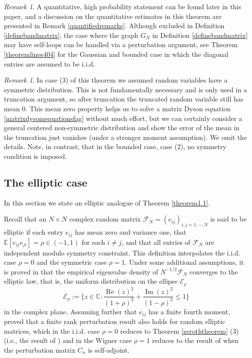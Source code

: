\documentclass[11pt,reqno]{amsart}
\theoremstyle{plain}
\theoremstyle{remark}
\newtheorem{remark}[theorem]{Remark}
\numberwithin{equation}{section}
\begin{document}
\begin{remark}\label{remark1.56}
     A quantitative, high probability statement can be found later in this paper, and a discussion on the quantitative estimates in this theorem are presented in Remark \ref{quantifiedremarks}. 
     Although excluded in Definition \ref{definebandmatrix}, the case where the graph $G_N$ in Definition \ref{definebandmatrix} may have self-loops can be handled via a perturbation argument, see Theorem \ref{theoremlines404} for the Gaussian and bounded case in which the diagonal entries are assumed to be i.i.d.
\end{remark}



\begin{remark}
    In case (3) of this theorem we assumed random variables have a symmetric distribution. This is not fundamentally necessary and is only used in a truncation argument, so after truncation the truncated random variable still has mean 0. This mean zero property helps us to solve a matrix Dyson equation \eqref{matrixdysomequationsfag} without much effort, but we can certainly consider a general centered non-symmetric distribution and show the error of the mean in the truncation just vanishes (under a stronger moment assumption). We omit the details. Note, in contrast, that in the bounded case, case (2), no symmetry condition is imposed.  
\end{remark}




\subsection{The elliptic case}

In this section we state an elliptic analogue of Theorem \ref{theorem1.1}.

Recall that an $N\times N$ complex random matrix $\mathcal{F}_N=(e_{ij})_{i,j=1,\cdots,N}$ is said to be elliptic if each entry $e_{ij}$ has mean zero and variance one, that $\mathbb{E}[e_{ij}e_{ji}]=\rho\in(-1,1)$ for each $i\neq j$, and that all entries of $\mathcal{F}_N$ are independent modulo symmetry constraint. This definition interpolates the i.i.d. case $\rho=0$ and the symmetric case $\rho=1$.
Under some additional assumptions, it is proved in \cite{nguyen2015elliptic} that the empirical eigenvalue density of $N^{-1/2}\mathcal{F}_N$ converges to the elliptic law, that is, the uniform distribution on the ellipse $\mathcal{E}_\rho$ 
\begin{equation}\label{ellipselaw}
\mathcal{E}_\rho:=\{z\in\mathbb{C}:\frac{\operatorname{Re}(z)^2}{(1+\rho)^2}+\frac{\operatorname{Im}(z)^2}{(1-\rho)^2}\leq 1\}
\end{equation}
in the complex plane. 
Assuming further that $e_{ij}$ has a finite fourth moment, \cite{article1221} proved that a finite rank perturbation result also holds for random elliptic matrices, which in the i.i.d. case $\rho=0$ reduces to Theorem \ref{zeroththeorem} (3) (i.e., the result of \cite{tao2013outliers}) and in the Wigner case $\rho=1$ reduces to the result of \cite{peche2006largest}
when the perturbation matrix $C_n$ is self-adjoint.
\end{document}
